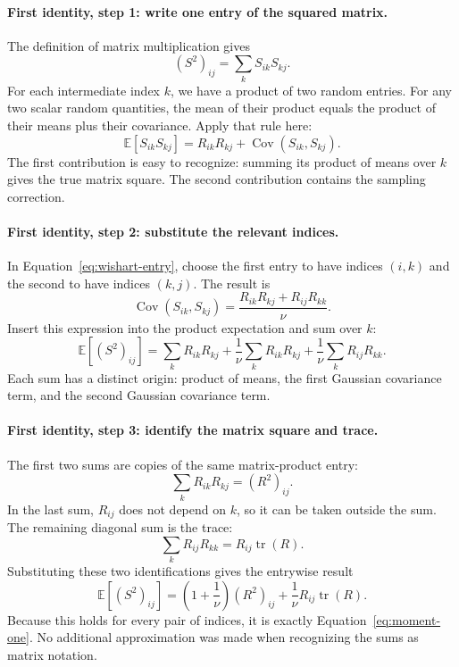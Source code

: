 \documentclass[11pt]{article}
\newcommand{\E}{\mathbb{E}}
\newcommand{\cov}{\operatorname{Cov}}
\begin{document}
\paragraph{First identity, step 1: write one entry of the squared matrix.}
The definition of matrix multiplication gives
\begin{equation}
 (S^2)_{ij}=\sum_k S_{ik}S_{kj}.
\end{equation}
For each intermediate index $k$, we have a product of two random entries.
For any two scalar random quantities, the mean of their product equals
the product of their means plus their covariance. Apply that rule here:
\begin{equation}
 \E[S_{ik}S_{kj}]
       =R_{ik}R_{kj}+\cov(S_{ik},S_{kj}).
\end{equation}
The first contribution is easy to recognize: summing its product of
means over $k$ gives the true matrix square. The second contribution
contains the sampling correction.

\paragraph{First identity, step 2: substitute the relevant indices.}
In Equation~\eqref{eq:wishart-entry}, choose the first entry to have indices
$(i,k)$ and the second to have indices $(k,j)$. The result is
\begin{equation}
 \cov(S_{ik},S_{kj})
   =\frac{R_{ik}R_{kj}+R_{ij}R_{kk}}{\nu}.
\end{equation}
Insert this expression into the product expectation and sum over $k$:
\begin{equation}
 \E[(S^2)_{ij}]
 =\sum_k R_{ik}R_{kj}
 +\frac1\nu\sum_k R_{ik}R_{kj}
 +\frac1\nu\sum_k R_{ij}R_{kk}.
\end{equation}
Each sum has a distinct origin: product of means, the first Gaussian
covariance term, and the second Gaussian covariance term.

\paragraph{First identity, step 3: identify the matrix square and trace.}
The first two sums are copies of the same matrix-product entry:
\begin{equation}
 \sum_k R_{ik}R_{kj}=(R^2)_{ij}.
\end{equation}
In the last sum, $R_{ij}$ does not depend on $k$, so it can be taken
outside the sum. The remaining diagonal sum is the trace:
\begin{equation}
 \sum_k R_{ij}R_{kk}=R_{ij}\operatorname{tr}(R).
\end{equation}
Substituting these two identifications gives the entrywise result
\begin{equation}
 \E[(S^2)_{ij}]
 =\left(1+\frac1\nu\right)(R^2)_{ij}
       +\frac1\nu R_{ij}\operatorname{tr}(R).
\end{equation}
Because this holds for every pair of indices, it is exactly
Equation~\eqref{eq:moment-one}. No additional approximation was made
when recognizing the sums as matrix notation.
\end{document}
